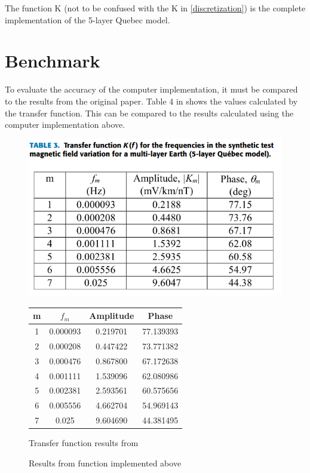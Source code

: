 \documentclass[letterpaper, 12 pt, conference]{ieeeconf}  %
\begin{document}
The function K (not to be confused with the K in \ref{discretization}) is the complete implementation of the 5-layer Quebec model.

\vspace{1cm}

\section{Benchmark}
To evaluate the accuracy of the computer implementation, it must be compared to the results from the original paper. Table 4 in \cite{8859181} shows the values calculated by the transfer function. This can be compared to the results calculated using the computer implementation above. 


\begin{figure}
    
    \centering
    
    \includegraphics[width=\columnwidth]{Figure_3.png}
		    
		    
		  {\begin{tabular}{|c|c|c|c|}
        \hline
        m & $f_m$ & Amplitude & Phase \\
        \hline
        1 & 0.000093 & 0.219701 & 77.139393 \\
        \hline
        2 & 0.000208 & 0.447422 & 73.771382 \\
        \hline
        3 & 0.000476 & 0.867800 & 67.172638 \\
        \hline
        4 & 0.001111 & 1.539096 & 62.080986 \\
        \hline
        5 & 0.002381 & 2.593561 & 60.575656 \\
        \hline
        6 & 0.005556 & 4.662704 & 54.969143 \\
        \hline
        7 & 0.025 & 9.604690 & 44.381495 \\
        \hline
    \end{tabular}}
		    

		\caption{Transfer function results from \cite{8859181}}
		\caption{Results from function implemented above}
	\end{figure}
\end{document}
